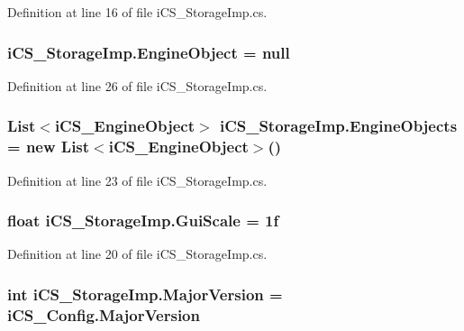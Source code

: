 Definition at line 16 of file i\+C\+S\+\_\+\+Storage\+Imp.\+cs.

\hypertarget{classi_c_s___storage_imp_a52d7f87304a8de2af04059d859a1f4ed}{
\subsubsection[{Engine\+Object}]{ i\+C\+S\+\_\+\+Storage\+Imp.\+Engine\+Object = null}}\label{classi_c_s___storage_imp_a52d7f87304a8de2af04059d859a1f4ed}


Definition at line 26 of file i\+C\+S\+\_\+\+Storage\+Imp.\+cs.

\hypertarget{classi_c_s___storage_imp_a8b5f40004724c1eac18c125dfed1e77e}{
\subsubsection[{Engine\+Objects}]{\setlength{\rightskip}{0pt plus 5cm}List$<${\bf i\+C\+S\+\_\+\+Engine\+Object}$>$ i\+C\+S\+\_\+\+Storage\+Imp.\+Engine\+Objects = new List$<${\bf i\+C\+S\+\_\+\+Engine\+Object}$>$()}}\label{classi_c_s___storage_imp_a8b5f40004724c1eac18c125dfed1e77e}


Definition at line 23 of file i\+C\+S\+\_\+\+Storage\+Imp.\+cs.

\hypertarget{classi_c_s___storage_imp_a6e940c822b8606f626744774450e5e2a}{
\subsubsection[{Gui\+Scale}]{\setlength{\rightskip}{0pt plus 5cm}float i\+C\+S\+\_\+\+Storage\+Imp.\+Gui\+Scale = 1f}}\label{classi_c_s___storage_imp_a6e940c822b8606f626744774450e5e2a}


Definition at line 20 of file i\+C\+S\+\_\+\+Storage\+Imp.\+cs.

\hypertarget{classi_c_s___storage_imp_a04f4ac9776002b4e3d1d0c7a62b62ace}{
\subsubsection[{Major\+Version}]{\setlength{\rightskip}{0pt plus 5cm}int i\+C\+S\+\_\+\+Storage\+Imp.\+Major\+Version = i\+C\+S\+\_\+\+Config.\+Major\+Version}}\label{classi_c_s___storage_imp_a04f4ac9776002b4e3d1d0c7a62b62ace}


